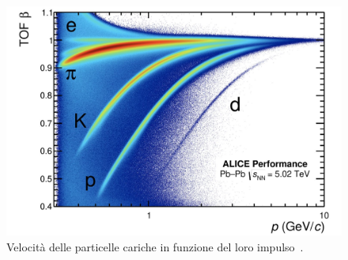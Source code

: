     \begin{figure}[p]
        \centering
        \includegraphics[width=1\linewidth]{res/fig/2-chapter/8-ALICE-PbPb5.02TeV-performance.jpg}
        \caption{Velocità delle particelle cariche in funzione del loro impulso~\cite{}.}
        \label{fig:2-8-ALICE-PbPb5.02TeV-performance}
    \end{figure}
